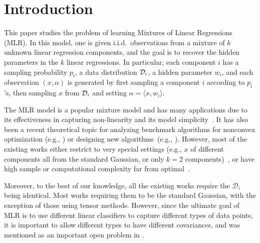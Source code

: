 \section{Introduction}\label{sec:intro}
This paper studies the problem of learning Mixtures of Linear Regressions (MLR). In this model, one is given i.i.d.\ observations from a mixture of $k$ unknown linear regression components, and the goal is to recover the hidden parameters in the $k$ linear regressions.
In particular, each component $i$ has a sampling probability $p_i$, a data distribution $\mathcal{D}_i$, a hidden parameter $w_i$, and each observation $(x,\alpha)$ is generated by first sampling a component $i$ according to $p_i$'s, then sampling $x$ from $\mathcal{D}_i$ and setting $\alpha = \langle x, w_i\rangle$. 


The MLR model is a popular mixture model and has many applications due to its effectiveness in capturing non-linearity and its model simplicity~\citep{de1989mixtures,jordan1994hierarchical,faria2010fitting,zhong2016mixed}. It has also been a recent theoretical topic for analyzing benchmark algorithms for nonconvex optimization (e.g., \citep{chaganty2013spectral,klusowski2017estimating}) or designing new algorithms~(e.g., \citep{chen2014convex}).
However, most of the existing works either restrict to very special settings (e.g., $x$ of different components all from the standard Gaussian, or only $k=2$ components)~\citep{chen2014convex,yi2014alternating,zhong2016mixed,balakrishnan2017statistical,klusowski2017estimating}, or have high sample or computational complexity far from optimal~\citep{chaganty2013spectral,sedghi2016provable}. 

Moreover, to the best of our knowledge, all the existing works require the $\mathcal{D}_i$ being identical. Most works requiring them to be the standard Gaussian, with the exception of those using tensor methods.
However, since the ultimate goal of MLR is to use different linear classifiers to capture different types of data points, it is important to allow different types to have different covariances, and was mentioned as an important open problem in \citep{sedghi2016provable}. 

